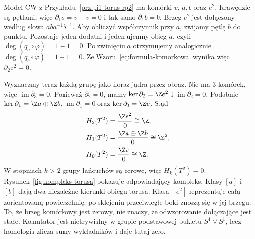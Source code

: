 \begin{przyklad}[Torus]
\label{prz:homologia-cw-torus}
Model CW z
Przykładu~\ref{prz:pi1-torus-rp2}
ma komórki $v$,
$a,b$ oraz $e^2$.
Krawędzie są pętlami, więc
$\partial_1a=v-v=0$ i tak samo $\partial_1b=0$.
Brzeg $e^2$ jest dołączony
według słowa $aba^{-1}b^{-1}$.
Aby obliczyć współczynnik przy $a$, zwijamy pętlę $b$ do punktu.
Pozostaje jeden dodatni i jeden ujemny obieg $a$, czyli
$\deg(q_a\circ\varphi)=1-1=0$. Po zwinięciu $a$ otrzymujemy
analogicznie $\deg(q_b\circ\varphi)=1-1=0$.
Ze Wzoru~\eqref{eq:formula-komorkowa} wynika więc $\partial_2e^2=0$.

Wyznaczmy teraz każdą grupę jako iloraz jądra przez obraz.
Nie ma $3$-komórek, więc $\operatorname{im}\partial_3=0$.
Ponieważ $\partial_2=0$, mamy
$\ker\partial_2=\Z e^2$ i $\operatorname{im}\partial_2=0$.
Podobnie $\ker\partial_1=\Z a\oplus\Z b$,
$\operatorname{im}\partial_1=0$ oraz $\ker\partial_0=\Z v$.
Stąd
\[
 \begin{aligned}
 H_2(T^2)&=\frac{\Z e^2}{0}\cong\Z,\\
 H_1(T^2)&=\frac{\Z a\oplus\Z b}{0}\cong\Z^2,\\
 H_0(T^2)&=\frac{\Z v}{0}\cong\Z.
 \end{aligned}
\]
W stopniach $k>2$ grupy łańcuchów są zerowe, więc $H_k(T^2)=0$.
Rysunek~\ref{fig:kompleks-torusa}
pokazuje odpowiadający kompleks.
Klasy $[a]$ i $[b]$ dają dwa niezależne kierunki obiegu torusa.
Klasa $[e^2]$ reprezentuje całą zorientowaną powierzchnię:
po sklejeniu przeciwległe boki znoszą się w jej brzegu.
To, że brzeg komórkowy jest zerowy, nie znaczy,
że odwzorowanie dołączające jest stałe. Komutator jest nietrywialny
w grupie podstawowej bukietu $S^1\vee S^1$, lecz
homologia zlicza sumy wykładników i daje tutaj zero.
\end{przyklad}

